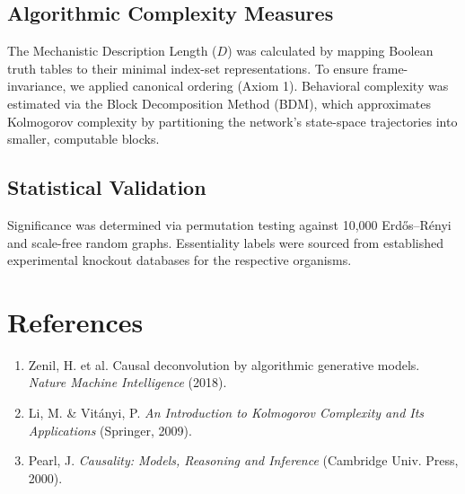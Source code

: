 \documentclass{nature}
\begin{document}
\subsection*{Algorithmic Complexity Measures}
The Mechanistic Description Length ($D$) was calculated by mapping Boolean truth tables to their minimal index-set representations. To ensure frame-invariance, we applied canonical ordering (Axiom 1). Behavioral complexity was estimated via the Block Decomposition Method (BDM), which approximates Kolmogorov complexity by partitioning the network's state-space trajectories into smaller, computable blocks.

\subsection*{Statistical Validation}
Significance was determined via permutation testing against 10,000 Erdős–Rényi and scale-free random graphs. Essentiality labels were sourced from established experimental knockout databases for the respective organisms.

\section*{References}
\begin{enumerate}
    \item Zenil, H. et al. Causal deconvolution by algorithmic generative models. \textit{Nature Machine Intelligence} (2018).
    \item Li, M. \& Vitányi, P. \textit{An Introduction to Kolmogorov Complexity and Its Applications} (Springer, 2009).
    \item Pearl, J. \textit{Causality: Models, Reasoning and Inference} (Cambridge Univ. Press, 2000).
\end{enumerate}
\end{document}
